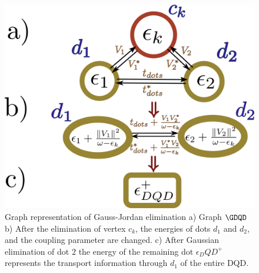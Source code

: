 \begin{figure}[t]
    \centering
    \includegraphics[scale=0.3]{IMAGES/Graphs/DQD-Pro.png}
    \caption{ Graph representation of Gauss-Jordan elimination a) Graph $\GDQD$ b) After the elimination of vertex $c_k$, the energies of dots $d_1$ and $d_2$, and the coupling parameter are changed. c) After Gaussian elimination of dot $2$ the energy of the remaining dot $\epsilon_DQD^+$ represents the transport information through $d_1$ of the entire DQD. \protect{}}
    \label{fig:graphDQD}
\end{figure}


